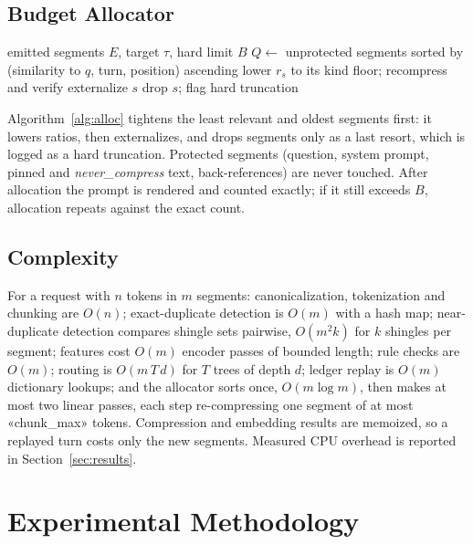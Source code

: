\documentclass[journal]{IEEEtran}
\begin{document}
\subsection{Budget Allocator}\label{sec:budget}
\begin{algorithm}[t]\caption{Greedy budget allocation}\label{alg:alloc}\small
\begin{algorithmic}[1]
\Require emitted segments $E$, target $\tau$, hard limit $B$
\State $Q\gets$ unprotected segments sorted by (similarity to $q$, turn, position) ascending
 lower $r_s$ to its kind floor; recompress and verify \EndFor
{}  externalize $s$ \EndIf \EndFor
{} drop $s$; flag hard truncation \EndFor
\end{algorithmic}\end{algorithm}
Algorithm~\ref{alg:alloc} tightens the least relevant and oldest segments first: it lowers ratios, then externalizes, and drops
segments only as a last resort, which is logged as a hard truncation. Protected segments (question, system prompt, pinned and
\textit{never\_compress} text, back-references) are never touched. After allocation the prompt is rendered and counted exactly; if
it still exceeds $B$, allocation repeats against the exact count.

\subsection{Complexity}
For a request with $n$ tokens in $m$ segments: canonicalization, tokenization and chunking are $O(n)$; exact-duplicate detection is
$O(m)$ with a hash map; near-duplicate detection compares shingle sets pairwise, $O(m^2 k)$ for $k$ shingles per segment; features
cost $O(m)$ encoder passes of bounded length; rule checks are $O(m)$; routing is $O(m\,T\,d)$ for $T$ trees of depth $d$; ledger
replay is $O(m)$ dictionary lookups; and the allocator sorts once, $O(m\log m)$, then makes at most two linear passes, each step
re-compressing one segment of at most «chunk_max» tokens. Compression and embedding results are memoized, so a replayed turn costs
only the new segments. Measured CPU overhead is reported in Section~\ref{sec:results}.

\section{Experimental Methodology}\label{sec:exp}
\end{document}
